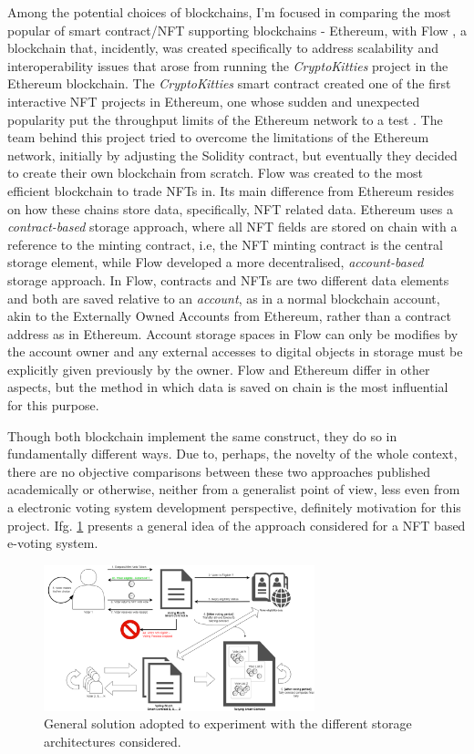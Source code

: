 \documentclass[../main.tex]{subfiles}
\begin{document}
\par
Among the potential choices of blockchains, I'm focused in comparing the most popular of smart contract/NFT supporting blockchains - Ethereum, with Flow \cite{flow2020a}, a blockchain that, incidently, was created specifically to address scalability and interoperability issues that arose from running the \textit{CryptoKitties} project in the Ethereum blockchain. The \textit{CryptoKitties} smart contract created one of the first interactive NFT projects in Ethereum, one whose sudden and unexpected popularity put the throughput limits of the Ethereum network to a test \cite{bbc2017}. The team behind this project tried to overcome the limitations of the Ethereum network, initially by adjusting the Solidity contract, but eventually they decided to create their own blockchain from scratch. Flow was created to the most efficient blockchain to trade NFTs in. Its main difference from Ethereum resides on how these chains store data, specifically, NFT related data. Ethereum uses a \textit{contract-based} storage approach, where all NFT fields are stored on chain with a reference to the minting contract, i.e, the NFT minting contract is the central storage element, while Flow developed a more decentralised, \textit{account-based} storage approach. In Flow, contracts and NFTs are two different data elements and both are saved relative to an \textit{account}, as in a normal blockchain account, akin to the Externally Owned Accounts from Ethereum, rather than a contract address as in Ethereum. Account storage spaces in Flow can only be modifies by the account owner and any external accesses to digital objects in storage must be explicitly given previously by the owner. Flow and Ethereum differ in other aspects, but the method in which data is saved on chain is the most influential for this purpose.
\par
Though both blockchain implement the same construct, they do so in fundamentally different ways. Due to, perhaps, the novelty of the whole context, there are no objective comparisons between these two approaches published academically or otherwise, neither from a generalist point of view, less even from a electronic voting system development perspective, definitely motivation for this project. Ifg. \ref{fig:general_solution} presents a general idea of the approach considered for a NFT based e-voting system.

\begin{figure}[htp]
    \centering
    \includegraphics[width=0.7\textwidth]{../Images/01_general_solution.png}
    \caption{General solution adopted to experiment with the different storage architectures considered.}
    \label{fig:general_solution}
\end{figure}
\end{document}
